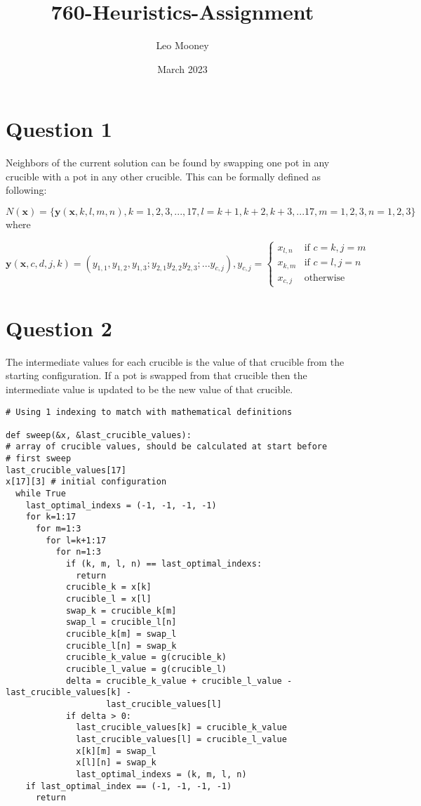 \documentclass{article}
\title{760-Heuristics-Assignment}
\author{Leo Mooney}
\date{March 2023}
\begin{document}
\maketitle

\section{Question 1}
Neighbors of the current solution can be found by swapping one pot in
any crucible with a pot in any other crucible.
This can be formally defined as following:

$N(\mathbf{x}) = \{\mathbf{y}(\mathbf{x}, k, l, m, n), k=1,2,3,...,17, 
l=k+1,k+2,k+3,...17, m=1,2,3, n=1,2,3\}$ where

$$\mathbf{y}(\mathbf{x},c,d,j,k)=(y_{1, 1},y_{1, 2},y_{1, 3};
y_{2, 1}y_{2, 2}y_{2, 3};...y_{c, j}),y_{c,j}=
\begin{cases}
    x_{l, n} & \text{if } c=k,j=m \\
    x_{k, m} & \text{if } c=l,j=n \\
    x_{c,j} & \text{otherwise}
\end{cases}$$

\section{Question 2}
The intermediate values for each crucible is the value of that crucible
from the starting configuration. If a pot is swapped from that crucible
then the intermediate value is updated to be the new value of that
crucible.

\begin{verbatim}
# Using 1 indexing to match with mathematical definitions

def sweep(&x, &last_crucible_values):
# array of crucible values, should be calculated at start before 
# first sweep
last_crucible_values[17] 
x[17][3] # initial configuration
  while True 
    last_optimal_indexs = (-1, -1, -1, -1)
    for k=1:17
      for m=1:3
        for l=k+1:17
          for n=1:3
            if (k, m, l, n) == last_optimal_indexs:
              return
            crucible_k = x[k] 
            crucible_l = x[l] 
            swap_k = crucible_k[m]
            swap_l = crucible_l[n]
            crucible_k[m] = swap_l
            crucible_l[n] = swap_k
            crucible_k_value = g(crucible_k)
            crucible_l_value = g(crucible_l)
            delta = crucible_k_value + crucible_l_value - last_crucible_values[k] - 
                    last_crucible_values[l]
            if delta > 0:
              last_crucible_values[k] = crucible_k_value
              last_crucible_values[l] = crucible_l_value
              x[k][m] = swap_l
              x[l][n] = swap_k
              last_optimal_indexs = (k, m, l, n)
    if last_optimal_index == (-1, -1, -1, -1)
      return
          
\end{verbatim}
\end{document}
